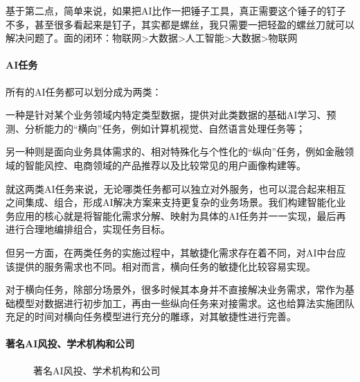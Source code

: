 \documentclass[letterpaper,10pt,english]{sphinxmanual}
\begin{document}
基于第二点，简单来说，如果把AI比作一把锤子工具，真正需要这个锤子的钉子不多，甚至很多看起来是钉子，其实都是螺丝，我只需要一把轻盈的螺丝刀就可以解决问题了。面的闭环：物联网\sphinxhyphen{}>大数据\sphinxhyphen{}>人工智能\sphinxhyphen{}>大数据\sphinxhyphen{}>物联网


\paragraph{AI任务}
\label{\detokenize{chapter_introduction/AI:id28}}
所有的AI任务都可以划分成为两类：%
\begin{footnote}[238]\sphinxAtStartFootnote
{}
%
\end{footnote}

一种是针对某个业务领域内特定类型数据，提供对此类数据的基础AI学习、预测、分析能力的“横向”任务，例如计算机视觉、自然语言处理任务等；

另一种则是面向业务具体需求的、相对特殊化与个性化的“纵向”任务，例如金融领域的智能风控、电商领域的产品推荐以及比较常见的用户画像构建等。

就这两类AI任务来说，无论哪类任务都可以独立对外服务，也可以混合起来相互之间集成、组合，形成AI解决方案来支持更复杂的业务场景。我们构建智能化业务应用的核心就是将智能化需求分解、映射为具体的AI任务并一一实现，最后再进行合理地编排组合，实现任务目标。

但另一方面，在两类任务的实施过程中，其敏捷化需求存在着不同，对AI中台应该提供的服务需求也不同。相对而言，横向任务的敏捷化比较容易实现。

对于横向任务，除部分场景外，很多时候其本身并不直接解决业务需求，常作为基础模型对数据进行初步加工，再由一些纵向任务来对接需求。这也给算法实施团队充足的时间对横向任务模型进行充分的雕琢，对其敏捷性进行完善。


\paragraph{著名AI风投、学术机构和公司}
\label{\detokenize{chapter_introduction/AI:id29}}
\begin{figure}[H]
\centering
\capstart

\noindent{}
\caption{著名AI风投、学术机构和公司\sphinxfootnotemark[239]}\label{\detokenize{chapter_introduction/AI:id41}}\end{figure}
%
\begin{footnotetext}[239]\sphinxAtStartFootnote
{}
%
\end{footnotetext}\ignorespaces 
\end{document}
